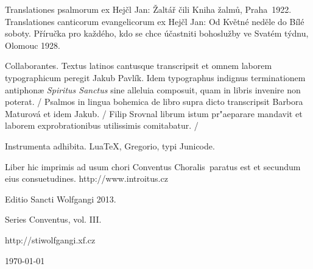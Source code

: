 \documentclass[a4paper, twoside, 12pt]{article}
\newcommand{\annusEditionis}{2013}
\begin{document}
Translationes psalmorum ex
Hejčl Jan: Žaltář čili Kniha žalmů, Praha~1922.
Translationes canticorum evangelicorum ex Hejčl Jan: 
Od Květné neděle do Bílé soboty. Příručka pro každého, kdo se chce účastniti
bohoslužby ve Svatém týdnu, Olomouc 1928.

Collaborantes.
Textus latinos cantusque transcripsit et omnem laborem typographicum peregit
Jakub Pavlík. Idem typographus indignus terminationem antiphonæ
\textit{Spiritus Sanctus} sine alleluia composuit, quam in libris invenire
non poterat. /
Psalmos in lingua bohemica de libro supra dicto transcripsit
Barbora Maturová et idem Jakub. /
Filip Srovnal librum istum pr"aeparare mandavit et laborem exprobrationibus
utilissimis comitabatur. /

Instrumenta adhibita.
LuaTeX, %
Gregorio, %
typi Junicode. %

\begin{center}
Liber hic imprimis ad usum chori 
\guillemotright Conventus Choralis\guillemotleft\ 
paratus est
et secundum eius consuetudines.
http://www.introitus.cz

\vspace{1cm}

{\large Editio Sancti Wolfgangi \annusEditionis .}

\vspace{2mm}

Series \guillemotright Conventus\guillemotleft, vol. III.

\vspace{1cm}

http://stiwolfgangi.xf.cz

\vfill

\today

\end{center}
\end{document}
